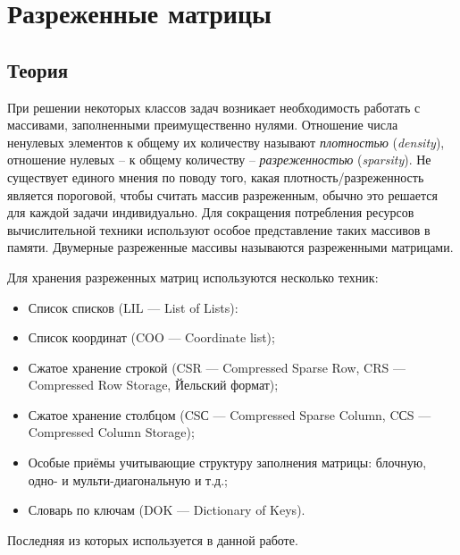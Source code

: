 \section{Разреженные матрицы}

\subsection{Теория}

При решении некоторых классов задач возникает необходимость работать с массивами, заполненными преимущественно нулями. Отношение числа ненулевых элементов к общему их количеству называют {\it плотностью} ({\it density}), отношение нулевых -- к общему количеству -- {\it разреженностью} ({\it sparsity}). Не существует единого мнения по поводу того, какая плотность/разреженность является пороговой, чтобы считать массив разреженным, обычно это решается для каждой задачи индивидуально. Для сокращения потребления ресурсов вычислительной техники используют особое представление таких массивов в памяти. Двумерные разреженные массивы называются разреженными матрицами.

Для хранения разреженных матриц используются несколько техник:
\begin{itemize}
    \item Список списков (LIL — List of Lists):

    \item Список координат (COO — Coordinate list);

    \item Сжатое хранение строкой (CSR — Compressed Sparse Row, CRS — Compressed Row Storage, Йельский формат);

    \item Сжатое хранение столбцом (CSС — Compressed Sparse Column, CСS — Compressed Column Storage);

    \item Особые приёмы учитывающие структуру заполнения матрицы: блочную, одно- и мульти-диагональную и т.д.;

    \item Словарь по ключам (DOK — Dictionary of Keys).
\end{itemize}

Последняя из которых используется в данной работе.